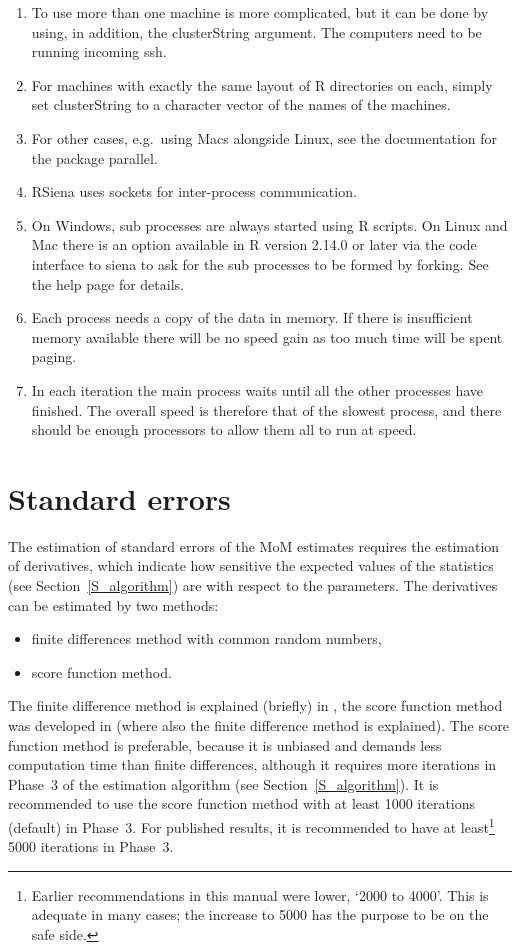 \documentclass[a4paper,fleqn,11pt]{article}
\newcommand{\+}{\, + \,}
\newcommand{\sfn}[1]{\textsf{#1}}
\newcommand{\R}{{\sf R }}
\newcommand{\RS}{{\sf \textsf{RSiena} }}
\begin{document}
\begin{enumerate}
\item To use more than one machine is more complicated, but it can be done by
  using, in addition, the \sfn{clusterString} argument.  The computers need to
  be running incoming \sfn{ssh}.
\item For machines with exactly the same layout of \R
  directories on each, simply set \sfn{clusterString} to a character vector of
  the names of the machines.
\item For other cases, e.g.\ using Macs alongside Linux,
  see the documentation for the package \sfn{parallel}.

\item \RS uses sockets for inter-process communication.
\item On Windows, sub processes are always started using \R scripts. On Linux
  and Mac there is an option available in \R version 2.14.0 or later via the
  code interface to \textsf{siena} to ask for the sub processes to be formed by
  forking. See the help page for details.
\item Each process needs a copy of the data in memory. If there is insufficient
  memory available there will be no speed gain as too much time will be spent
  paging.
\item In each iteration the main process waits until all the other processes
  have finished. The overall speed is therefore that of the slowest process, and
  there should be enough processors to allow them all to run at speed.
\end{enumerate}




\newpage
\hypertarget{T_se}{
\section{Standard errors}
}
\label{S_se}

The estimation of standard errors of the MoM estimates requires
the estimation of derivatives,
which indicate how sensitive the expected values of the statistics
(see Section~\ref{S_algorithm}) are with respect to the parameters.
The derivatives can be estimated by two methods:
\begin{itemize}
\item finite differences method with common random numbers,
\item score function method.
\end{itemize}
The finite difference method is explained (briefly) in \citet{Snijders01},
the score function method was developed in \citet{SchweinbergerSnijders07a}
(where also the finite difference method is explained).
The score function method is preferable, because it is unbiased
and demands less computation time than finite differences,
although it requires more iterations in Phase~3 of the estimation algorithm
(see Section~\ref{S_algorithm}).
It is recommended to use the score function method with
at least 1000 iterations (default) in Phase~3.  For
published results, it is recommended to have at least\footnote{Earlier
recommendations in this manual were lower, `2000 to 4000'.
This is adequate in many cases; the increase to 5000 has the purpose
to be on the safe side.} 5000 iterations in Phase~3.
\end{document}
